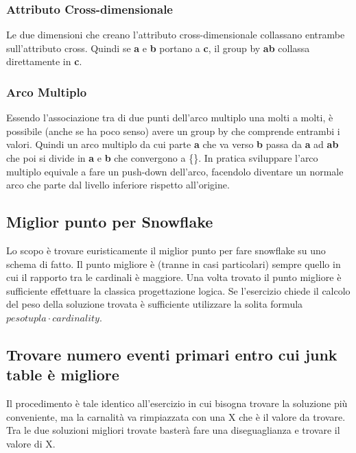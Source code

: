 \subsubsection{Attributo Cross-dimensionale}
Le due dimensioni che creano l'attributo cross-dimensionale collassano entrambe sull'attributo cross. Quindi  se \textbf{a} e \textbf{b} portano a  \textbf{c}, il group by {\textbf{ab}} collassa direttamente in {\textbf{c}}.
\subsubsection{Arco Multiplo}
Essendo l'associazione tra di due punti dell'arco multiplo una molti a molti, è possibile (anche se ha poco senso) avere un group by che comprende entrambi i valori. Quindi un arco multiplo da cui parte \textbf{a} che va verso \textbf{b} passa da \textbf{a} ad \textbf{ab}  che poi si divide in \textbf{a} e \textbf{b} che convergono a \{\}. In pratica sviluppare l'arco multiplo equivale a fare un push-down dell'arco, facendolo diventare un normale arco che parte dal livello inferiore rispetto all'origine.
\subsection{Miglior punto per Snowflake}
Lo scopo è trovare euristicamente il miglior punto per fare snowflake su uno schema di fatto. Il punto migliore è (tranne in casi particolari) sempre quello in cui il rapporto tra le cardinali è maggiore. Una volta trovato il punto migliore è sufficiente effettuare la classica progettazione logica. Se l’esercizio chiede il calcolo del peso della soluzione trovata è sufficiente utilizzare la solita formula $pesotupla \cdot cardinality$.
\subsection{Trovare numero eventi primari entro cui junk table è migliore}
Il procedimento è tale identico all’esercizio in cui bisogna trovare la soluzione più conveniente, ma la carnalità va rimpiazzata con una X che è il valore da trovare. Tra le due soluzioni migliori trovate basterà fare una diseguaglianza e trovare il valore di X.
